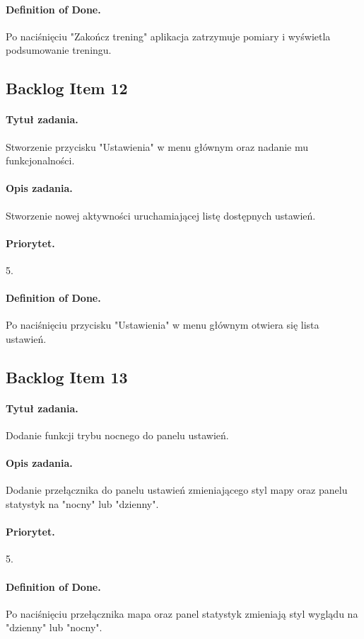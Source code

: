 \documentclass[a4paper]{article}
\begin{document}
\paragraph{Definition of Done.} Po naciśnięciu "Zakończ trening" aplikacja zatrzymuje pomiary i wyświetla podsumowanie treningu.

\subsection{Backlog Item 12}
\paragraph{Tytuł zadania.} Stworzenie przycisku "Ustawienia" w menu głównym oraz nadanie mu funkcjonalności.
\paragraph{Opis zadania.} Stworzenie nowej aktywności uruchamiającej listę dostępnych ustawień.
\paragraph{Priorytet.} 5.
\paragraph{Definition of Done.} Po naciśnięciu przycisku "Ustawienia" w menu głównym otwiera się lista ustawień.

\subsection{Backlog Item 13}
\paragraph{Tytuł zadania.} Dodanie funkcji trybu nocnego do panelu ustawień.
\paragraph{Opis zadania.} Dodanie przełącznika do panelu ustawień zmieniającego styl mapy oraz panelu statystyk na "nocny" lub "dzienny".
\paragraph{Priorytet.} 5.
\paragraph{Definition of Done.} Po naciśnięciu przełącznika mapa oraz panel statystyk zmieniają styl wyglądu na "dzienny" lub "nocny".
\end{document}
